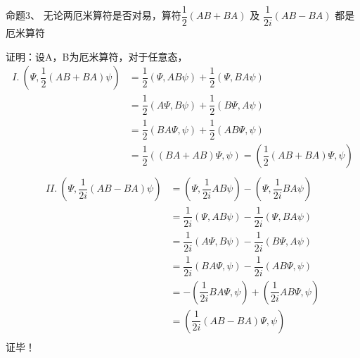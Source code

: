 \begin{frame} [allowframebreaks=]
    \frametitle{}
    \begin{tcolorbox1}{命题3、}
        无论两厄米算符是否对易，算符$\dfrac{1}{2}(AB+BA)$ 及 $\dfrac{1}{2i}(AB-BA) $ 都是厄米算符
    \end{tcolorbox1}
    \alert{证明：}设A，B为厄米算符，对于任意态，
    \begin{equation*}
        \begin{split}
            I.~ (\Psi, \dfrac{1}{2}(AB+BA)\psi ) &=\dfrac{1}{2}(\Psi, AB\psi) + \dfrac{1}{2}(\Psi, BA\psi)  \\
            &=\dfrac{1}{2}(A\Psi, B\psi) + \dfrac{1}{2}(B\Psi, A\psi)  \\
            &=\dfrac{1}{2}(BA\Psi, \psi) + \dfrac{1}{2}(AB\Psi, \psi)  \\
            &=\dfrac{1}{2}((BA+AB)\Psi, \psi) =(\dfrac{1}{2}(AB+BA)\Psi, \psi)\\
         \end{split}
    \end{equation*}  
    \begin{equation*}
        \begin{split}
            II.~ (\Psi, \dfrac{1}{2i}(AB-BA)\psi ) &= (\Psi, \dfrac{1}{2i}AB\psi) - (\Psi, \dfrac{1}{2i}BA\psi)\\  
            &=\dfrac{1}{2i}(\Psi, AB\psi) - \dfrac{1}{2i}(\Psi, BA\psi)  \\
            &=\dfrac{1}{2i}(A\Psi, B\psi) - \dfrac{1}{2i}(B\Psi, A\psi)  \\
            &=\dfrac{1}{2i}(BA\Psi, \psi) - \dfrac{1}{2i}(AB\Psi, \psi)  \\
            &=-(\dfrac{1}{2i}BA\Psi, \psi) +(\dfrac{1}{2i}AB\Psi, \psi)  \\
            &=(\dfrac{1}{2i}(AB-BA)\Psi, \psi) \\
         \end{split}
    \end{equation*}  
    证毕！
\end{frame}  

